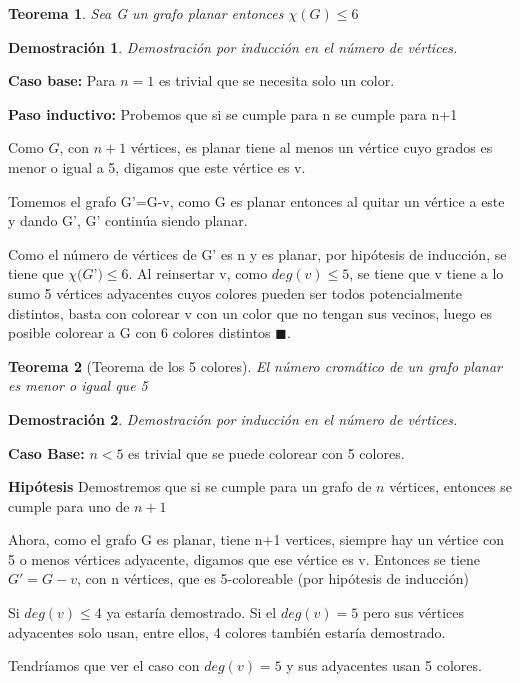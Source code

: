 \documentclass[a4paper,1pt]{report}
\newtheorem*{teo}{Teorema}
\newtheorem*{dem}{Demostración}
\begin{document}
\begin{teo}
 Sea G un grafo planar entonces $\chi(G)\leq 6$
\end{teo}

\begin{dem}
Demostración por inducción en el número de v\'ertices.
\end{dem}

\textbf{Caso base:} Para $n=1$ es trivial que se necesita solo un color.

\textbf{Paso inductivo:} Probemos que si se cumple para n se cumple para n+1

Como $G$, con $n+1$ vértices, es planar tiene al menos un vértice cuyo grados es menor o igual a 5, digamos que este vértice es v.

Tomemos el grafo G'=G-v, como G es planar entonces al quitar un vértice a este y dando G', G' continúa siendo planar. 

Como el número de vértices de G' es n y es planar, por hipótesis de inducción, se tiene que 
$\chi(G$'$)\leq 6$. Al reinsertar v, como $deg(v)\leq 5$, se tiene que v tiene a lo sumo 5 vértices adyacentes cuyos colores pueden ser todos potencialmente distintos, basta con colorear v con un color que no tengan sus vecinos, luego es posible colorear a G con 6 colores distintos $\blacksquare$.

\begin{teo}[Teorema de los 5 colores] El número cromático de un grafo planar es menor o igual que 5 
\end{teo}

\begin{dem}
Demostración por inducción en el número de vértices.
\end{dem}

\textbf{Caso Base:} $n< 5$ es trivial que se puede colorear con 5 colores.

\textbf{Hip\'otesis} Demostremos que si se cumple para un grafo de $n$ v\'ertices, entonces se cumple para uno de $n+1$

Ahora, como el grafo G es planar, tiene n+1 vertices, siempre hay un vértice con 5 o menos vértices adyacente, digamos que ese vértice es v. Entonces se tiene $G'= G-v$, con n vértices, que es 5-coloreable (por hipótesis de inducción)

Si $deg(v)\leq 4$ ya estaría demostrado. 
Si el $deg(v)=5$ pero sus vértices adyacentes solo usan, entre ellos, 4 colores también estaría demostrado.

Tendríamos que ver el caso con $deg(v)=5$ y sus adyacentes usan 5 colores.
\end{document}
